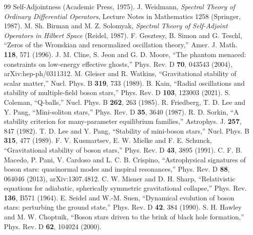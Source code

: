 \documentclass[11pt]{article}
\theoremstyle{remark}
\begin{document}
\begin{thebibliography}{99}
{Self-Adjointness} (Academic Press, 1975).
 J. Weidmann, \emph{Spectral Theory of Ordinary Differential Operators}, Lecture Notes in
Mathematics 1258 (Springer, 1987).
 M. Sh. Birman and M. Z. Solomyak, \emph{Spectral Theory of Self-Adjoint Operators in Hilbert
Space} (Reidel, 1987).
 F. Gesztesy, B. Simon and G. Teschl, ``Zeros of the Wronskian and renormalized oscillation theory,''
Amer. J. Math. \textbf{118}, 571 (1996).
 J. M. Cline, S. Jeon and G. D. Moore, ``The phantom menaced: constraints on low-energy effective
ghosts,'' Phys. Rev. D \textbf{70}, 043543 (2004), arXiv:hep-ph/0311312.
 M. Gleiser and R. Watkins, ``Gravitational stability of scalar matter,'' Nucl. Phys. B \textbf{319},
733 (1989).
 B. Kain, ``Radial oscillations and stability of multiple-field boson stars,'' Phys. Rev. D
\textbf{103}, 123003 (2021).
 S. Coleman, ``Q-balls,'' Nucl. Phys. B \textbf{262}, 263 (1985).
 R. Friedberg, T. D. Lee and Y. Pang, ``Mini-soliton stars,'' Phys. Rev. D \textbf{35}, 3640 (1987).
 R. D. Sorkin, ``A stability criterion for many-parameter equilibrium families,'' Astrophys. J.
\textbf{257}, 847 (1982).
 T. D. Lee and Y. Pang, ``Stability of mini-boson stars,'' Nucl. Phys. B \textbf{315}, 477 (1989).
 F. V. Kusmartsev, E. W. Mielke and F. E. Schunck, ``Gravitational stability of boson stars,'' Phys.
Rev. D \textbf{43}, 3895 (1991).
 C. F. B. Macedo, P. Pani, V. Cardoso and L. C. B. Crispino, ``Astrophysical signatures of boson
stars: quasinormal modes and inspiral resonances,'' Phys. Rev. D \textbf{88}, 064046 (2013), arXiv:1307.4812.
 C. W. Misner and D. H. Sharp, ``Relativistic equations for adiabatic, spherically symmetric
gravitational collapse,'' Phys. Rev. \textbf{136}, B571 (1964).
 E. Seidel and W.-M. Suen, ``Dynamical evolution of boson stars: perturbing the ground state,''
Phys. Rev. D \textbf{42}, 384 (1990).
 S. H. Hawley and M. W. Choptuik, ``Boson stars driven to the brink of black hole
formation,'' Phys. Rev. D \textbf{62}, 104024 (2000).

\end{thebibliography}
\end{document}

